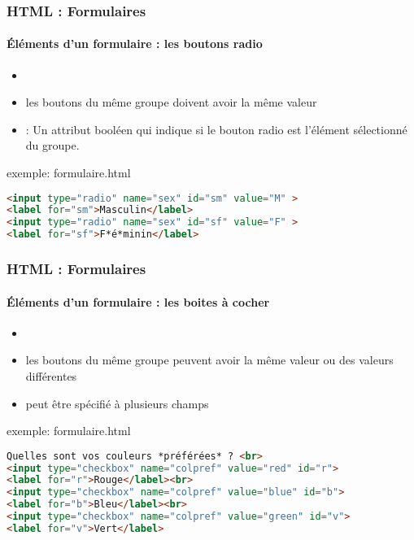 \documentclass[xcolor=table]{beamer}
\begin{document}
\begin{frame}[fragile]
\frametitle{HTML : Formulaires}
\framesubtitle{Éléments d'un formulaire : les boutons radio}

\begin{itemize}
	\item {}
	\item les boutons du même groupe doivent avoir la même valeur 
	\item {} : Un attribut booléen qui indique si le bouton radio est l'élément sélectionné du groupe.
\end{itemize}

\begin{exampleblock}{exemple: formulaire.html}
\lstset{escapeinside=**}
\scriptsize\bfseries\vspace{-6pt}
\begin{lstlisting}[language={html}]
<input type="radio" name="sex" id="sm" value="M" >
<label for="sm">Masculin</label>
<input type="radio" name="sex" id="sf" value="F" >
<label for="sf">F*é*minin</label>
\end{lstlisting}\vspace{-6pt}
\end{exampleblock}

\end{frame}

\begin{frame}[fragile]
\frametitle{HTML : Formulaires}
\framesubtitle{Éléments d'un formulaire : les boites à cocher}

\begin{itemize}
	\item {}
	\item les boutons du même groupe peuvent avoir la même valeur  ou des valeurs différentes
	\item {} peut être spécifié à plusieurs champs
\end{itemize}

\begin{exampleblock}{exemple: formulaire.html}
\lstset{escapeinside=**}
\scriptsize\bfseries\vspace{-6pt}
\begin{lstlisting}[language={html}]
Quelles sont vos couleurs *préférées* ? <br>
<input type="checkbox" name="colpref" value="red" id="r">
<label for="r">Rouge</label><br>
<input type="checkbox" name="colpref" value="blue" id="b">
<label for="b">Bleu</label><br>
<input type="checkbox" name="colpref" value="green" id="v">
<label for="v">Vert</label>
\end{lstlisting}\vspace{-6pt}
\end{exampleblock}

\end{frame}
\end{document}
